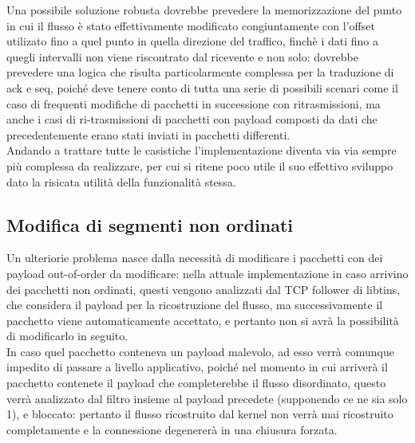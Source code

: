 Una possibile soluzione robusta dovrebbe prevedere la memorizzazione del punto in cui il flusso è stato effettivamente modificato congiuntamente con l'offset utilizato fino
a quel punto in quella direzione del traffico, finchè i dati fino a quegli intervalli non viene riscontrato dal ricevente e non solo:
dovrebbe prevedere una logica che risulta particolarmente complessa per la traduzione di ack e seq, poiché deve tenere conto di tutta una serie di possibili scenari
come il caso di frequenti modifiche di pacchetti in successione con ritrasmissioni, ma anche i casi di ri-trasmissioni di pacchetti con payload composti da dati
che precedentemente erano stati inviati in pacchetti differenti.\\
Andando a trattare tutte le casistiche l'implementazione diventa via via sempre più complessa da realizzare, per cui si ritene poco utile
il suo effettivo sviluppo dato la risicata utilità della funzionalità stessa.

\subsection{Modifica di segmenti non ordinati}

Un ulteriorie problema nasce dalla necessità di modificare i pacchetti con dei payload out-of-order da modificare:
nella attuale implementazione in caso arrivino dei pacchetti non ordinati, questi vengono analizzati dal TCP follower di libtins, che considera il payload per
la ricostruzione del flusso, ma successivamente il pacchetto viene automaticamente accettato, e pertanto non si avrà la possibilità di modificarlo in seguito.\\
In caso quel pacchetto conteneva un payload malevolo, ad esso verrà comunque impedito di passare a livello applicativo, poiché nel momento in cui arriverà
il pacchetto contenete il payload che completerebbe il flusso disordinato, questo verrà analizzato dal filtro insieme al payload precedete (supponendo ce ne sia solo 1),
e bloccato: pertanto il flusso ricostruito dal kernel non verrà mai ricostruito completamente e la connessione degenererà in una chiusura forzata.\\

